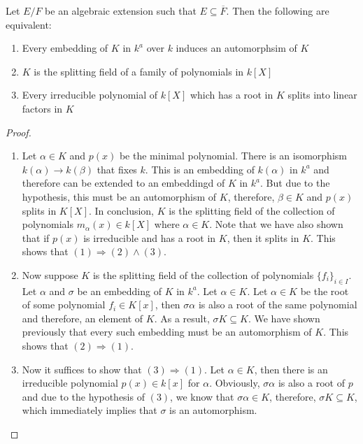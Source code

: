\begin{theorem}
    Let $E/F$ be an algebraic extension such that $E\subseteq\overline{F}$. Then the following are equivalent: 
    \begin{enumerate}
        \item Every embedding of $K$ in $k^a$ over $k$ induces an automorphsim of $K$
        \item $K$ is the splitting field of a family of polynomials in $k[X]$ 
        \item Every irreducible polynomial of $k[X]$ which has a root in $K$ splits into linear factors in $K$
    \end{enumerate}
\end{theorem}
\begin{proof}
    \hfill 
    \begin{enumerate}
        \item Let $\alpha\in K$ and $p(x)$ be the minimal polynomial. There is an isomorphism $k(\alpha)\to k(\beta)$ that fixes $k$. This is an embedding of $k(\alpha)$ in $k^a$ and therefore can be extended to an embeddingd of $K$ in $k^a$. But due to the hypothesis, this must be an automorphism of $K$, therefore, $\beta\in K$ and $p(x)$ splits in $K[X]$. In conclusion, $K$ is the splitting field of the collection of polynomials $m_{\alpha}(x)\in k[X]$ where $\alpha\in K$. Note that we have also shown that if $p(x)$ is irreducible and has a root in $K$, then it splits in $K$. This shows that $(1)\Longrightarrow (2)\wedge(3)$.

        \item Now suppose $K$ is the splitting field of the collection of polynomials $\{f_i\}_{i\in I}$. Let $\alpha$ and $\sigma$ be an embedding of $K$ in $k^a$. Let $\alpha\in K$. Let $\alpha\in K$ be the root of some polynomial $f_i\in K[x]$, then $\sigma\alpha$ is also a root of the same polynomial and therefore, an element of $K$. As a result, $\sigma K\subseteq K$. We have shown previously that every such embedding must be an automorphism of $K$. This shows that $(2)\Longrightarrow(1)$.

        \item Now it suffices to show that $(3)\Longrightarrow(1)$. Let $\alpha\in K$, then there is an irreducible polynomial $p(x)\in k[x]$ for $\alpha$. Obviously, $\sigma\alpha$ is also a root of $p$ and due to the hypothesis of $(3)$, we know that $\sigma\alpha\in K$, therefore, $\sigma K\subseteq K$, which immediately implies that $\sigma$ is an automorphism.
    \end{enumerate}
\end{proof}

